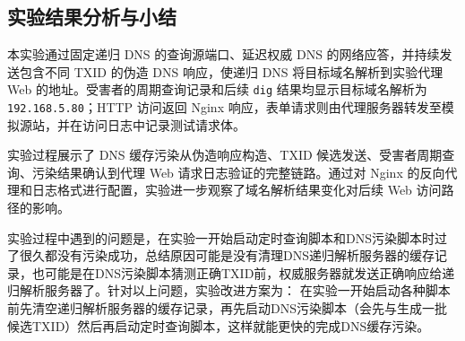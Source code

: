
\subsection{实验结果分析与小结}

本实验通过固定递归 DNS 的查询源端口、延迟权威 DNS 的网络应答，并持续发送包含不同 TXID 的伪造 DNS 响应，使递归 DNS 将目标域名解析到实验代理 Web 的地址。受害者的周期查询记录和后续 \texttt{dig} 结果均显示目标域名解析为 \texttt{192.168.5.80}；HTTP 访问返回 Nginx 响应，表单请求则由代理服务器转发至模拟源站，并在访问日志中记录测试请求体。

实验过程展示了 DNS 缓存污染从伪造响应构造、TXID 候选发送、受害者周期查询、污染结果确认到代理 Web 请求日志验证的完整链路。通过对 Nginx 的反向代理和日志格式进行配置，实验进一步观察了域名解析结果变化对后续 Web 访问路径的影响。

实验过程中遇到的问题是，在实验一开始启动定时查询脚本和DNS污染脚本时过了很久都没有污染成功，总结原因可能是没有清理DNS递归解析服务器的缓存记录，也可能是在DNS污染脚本猜测正确TXID前，权威服务器就发送正确响应给递归解析服务器了。针对以上问题，实验改进方案为：
在实验一开始启动各种脚本前先清空递归解析服务器的缓存记录，再先启动DNS污染脚本（会先与生成一批候选TXID）然后再启动定时查询脚本，这样就能更快的完成DNS缓存污染。